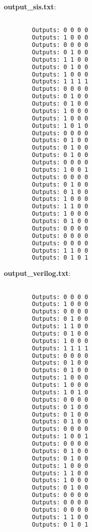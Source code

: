 \documentclass[a4paper]{article}
\begin{document}
\begin{figure}[H]
	\centering
	\begin{minipage}{\linewidth}
		\centering
		\begin{minipage}{0.45\linewidth}
			\textbf{output\_sis.txt}:
			\begin{lstlisting}[language=bash]

        Outputs: 0 0 0 0
        Outputs: 1 0 0 0
        Outputs: 0 0 0 0
        Outputs: 0 1 0 0
        Outputs: 1 1 0 0
        Outputs: 0 1 0 0
        Outputs: 1 0 0 0
        Outputs: 1 1 1 1
        Outputs: 0 0 0 0
        Outputs: 0 1 0 0
        Outputs: 0 1 0 0
        Outputs: 1 0 0 0
        Outputs: 1 0 0 0
        Outputs: 1 0 1 0
        Outputs: 0 0 0 0
        Outputs: 0 1 0 0
        Outputs: 0 1 0 0
        Outputs: 0 1 0 0
        Outputs: 0 0 0 0
        Outputs: 1 0 0 1
        Outputs: 0 0 0 0
        Outputs: 0 1 0 0
        Outputs: 0 1 0 0
        Outputs: 1 0 0 0
        Outputs: 1 1 0 0
        Outputs: 1 0 0 0
        Outputs: 0 1 0 0
        Outputs: 0 0 0 0
        Outputs: 0 0 0 0
        Outputs: 0 0 0 0
        Outputs: 1 1 0 0
        Outputs: 0 1 0 1
      \end{lstlisting}
		\end{minipage}
		\hspace{0.05\linewidth}
		\begin{minipage}{0.45\linewidth}
			\textbf{output\_verilog.txt}:
			\begin{lstlisting}[language=sh]

        Outputs: 0 0 0 0
        Outputs: 1 0 0 0
        Outputs: 0 0 0 0
        Outputs: 0 1 0 0
        Outputs: 1 1 0 0
        Outputs: 0 1 0 0
        Outputs: 1 0 0 0
        Outputs: 1 1 1 1
        Outputs: 0 0 0 0
        Outputs: 0 1 0 0
        Outputs: 0 1 0 0
        Outputs: 1 0 0 0
        Outputs: 1 0 0 0
        Outputs: 1 0 1 0
        Outputs: 0 0 0 0
        Outputs: 0 1 0 0
        Outputs: 0 1 0 0
        Outputs: 0 1 0 0
        Outputs: 0 0 0 0
        Outputs: 1 0 0 1
        Outputs: 0 0 0 0
        Outputs: 0 1 0 0
        Outputs: 0 1 0 0
        Outputs: 1 0 0 0
        Outputs: 1 1 0 0
        Outputs: 1 0 0 0
        Outputs: 0 1 0 0
        Outputs: 0 0 0 0
        Outputs: 0 0 0 0
        Outputs: 0 0 0 0
        Outputs: 1 1 0 0
        Outputs: 0 1 0 1
      \end{lstlisting}
		\end{minipage}
	\end{minipage}
\end{figure}
\end{document}
